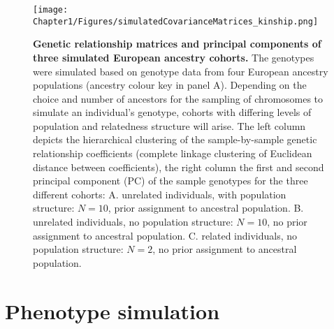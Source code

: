 \begin{figure}[htbp]
	\centering
	\texttt{[image: Chapter1/Figures/simulatedCovarianceMatrices\_kinship.png]}
	\caption[\textbf{Genetic relationship matrices and principal components of three simulated European ancestry cohorts.}]{\textbf{Genetic relationship matrices and principal components of three simulated European ancestry cohorts.} The genotypes were simulated based on genotype data from four European ancestry populations (ancestry colour key in panel A). Depending on the choice and number of ancestors for the sampling of chromosomes to simulate an individual's genotype, cohorts with differing levels of population and relatedness structure will arise. The left column depicts the hierarchical clustering of the sample-by-sample  genetic relationship coefficients (complete linkage clustering of Euclidean distance between coefficients), the right column the first and second principal component (PC) of the sample genotypes for the three different cohorts: A. unrelated individuals, with population structure: \(N=10\), prior assignment to ancestral population. B. unrelated individuals, no population structure: \(N=10\), no prior assignment to ancestral population. C. related individuals, no population structure: \(N=2\), no prior assignment to ancestral population.}
 	\label{fig:kinship-matrices}
\end{figure}


\section{Phenotype simulation}
\label{section:phenotype-simulation}

